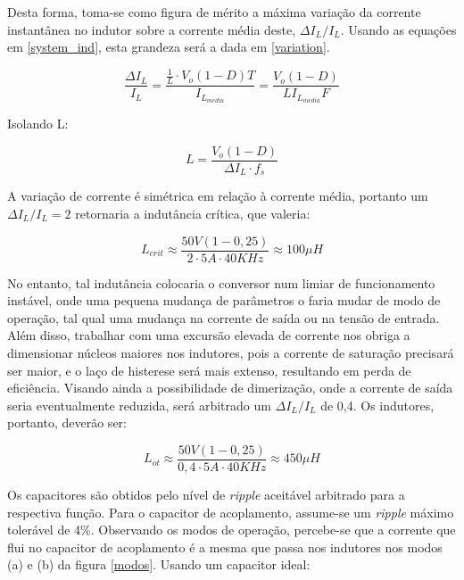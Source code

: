 \documentclass[
        12pt,
        openany, %
        oneside, %
        a4paper,			
        english,			
        brazil
        ]{abntbibufjf}
\begin{document}
Desta forma, toma-se como figura de mérito a máxima variação da corrente instantânea no indutor sobre a corrente média deste, $\Delta I_L/I_L$. Usando as equações em \ref{system_ind}, esta grandeza será a dada em \ref{variation}.

\begin{equation}
\frac{\Delta I_L}{I_L} = \frac{\frac{1}{L} \cdot V_{o}(1-D)T}{I_{L_{media}}} = 
\frac{ V_{o}(1-D)}{LI_{L_{media}}F}
\label{variation}
\end{equation}

Isolando L:

\begin{equation}
L = \frac{V_{o}(1-D)}{\Delta I_L \cdot f_s}
\end{equation}

A variação de corrente é simétrica em relação à corrente média, portanto um $\Delta I_L/I_L=2$ retornaria a indutância crítica, que valeria:

\begin{equation}
L_{crit} \approx \frac{ 50V(1-0,25)}{2 \cdot 5A \cdot 40KHz} \approx 100 \mu H
\end{equation}

No entanto, tal indutância colocaria o conversor num limiar de funcionamento instável, onde uma pequena mudança de parâmetros o faria mudar de modo de operação, tal qual uma mudança na corrente de saída ou na tensão de entrada. Além disso, trabalhar com uma excursão elevada de corrente nos obriga a dimensionar núcleos maiores nos indutores, pois a corrente de saturação precisará ser maior, e o laço de histerese será mais extenso, resultando em perda de eficiência. Visando ainda a possibilidade de dimerização, onde a corrente de saída seria eventualmente reduzida, será arbitrado um ${\Delta I_L}/{I_L}$ de 0,4. Os indutores, portanto, deverão ser:

\begin{equation}
L_{ot} \approx \frac{ 50V(1-0,25)}{0,4 \cdot 5A \cdot 40KHz} \approx 450 \mu H
\end{equation}


Os capacitores são obtidos pelo nível de \textit{ripple} aceitável arbitrado para a respectiva função. Para o capacitor de acoplamento, assume-se um \textit{ripple} máximo tolerável de 4\%. Observando os modos de operação, percebe-se que a corrente que flui no capacitor de acoplamento é a mesma que passa nos indutores nos modos (a) e (b) da figura \ref{modos}. Usando um capacitor ideal:
\end{document}
